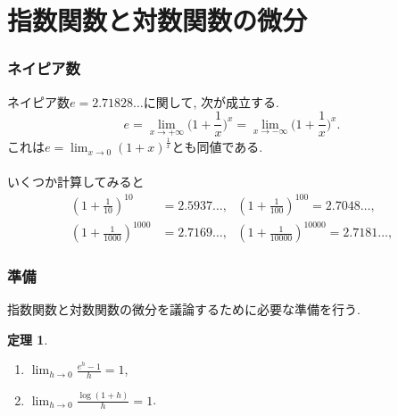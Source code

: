 \documentclass[dvipdfmx,cjk,10.2pt]{beamer}
\theoremstyle{definition}
\newtheorem{Thm}{定理}[section]
\begin{document}

\section{指数関数と対数関数の微分}

\begin{frame}
\frametitle{ネイピア数}

ネイピア数$e=2.71828\dots$に関して, 次が成立する.  
$$
e=\lim_{x \to +\infty} \Big(1+\frac{1}{x}\Big)^x = \lim_{x \to -\infty} \Big(1+\frac{1}{x}\Big)^x. 
$$
これは$\displaystyle e=\lim_{x\to 0}(1+x)^\frac{1}{x}$とも同値である. \\
\ \\

いくつか計算してみると
\begin{align*}
(1+\frac{1}{10})^{10}&=2.5937\dots, \ \ \ 
(1+\frac{1}{100})^{100}=2.7048\dots, \\
(1+\frac{1}{1000})^{1000}&=2.7169\dots, \ \ \ 
(1+\frac{1}{10000})^{10000}=2.7181\dots, 
\end{align*}

\end{frame}







\begin{frame}
\frametitle{準備}

指数関数と対数関数の微分を議論するために必要な準備を行う. 

\begin{Thm} \label{準備2}
\begin{enumerate}
\item $\displaystyle \lim_{h \to 0} \frac{e^h-1}{h}=1$, 
\item  $\displaystyle \lim_{h \to 0} \frac{\log(1+h)}{h}=1$. 
\end{enumerate}
\end{Thm}


\end{frame}



\end{document}
